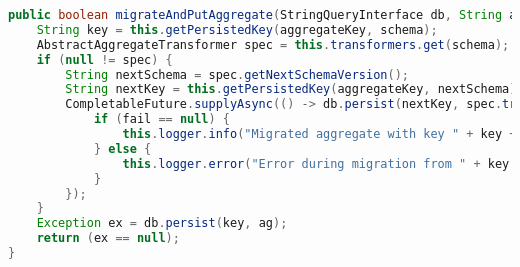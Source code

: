 \begin{lstlisting}[language=Java, caption={Metode for håndtering av PUT-spørring i Migrator.}]
public boolean migrateAndPutAggregate(StringQueryInterface db, String aggregateKey, String schema, String ag) {
    String key = this.getPersistedKey(aggregateKey, schema);
    AbstractAggregateTransformer spec = this.transformers.get(schema);
    if (null != spec) {
        String nextSchema = spec.getNextSchemaVersion();
        String nextKey = this.getPersistedKey(aggregateKey, nextSchema);
        CompletableFuture.supplyAsync(() -> db.persist(nextKey, spec.transformAggregate(ag))).thenAccept((fail) -> {
            if (fail == null) {
                this.logger.info("Migrated aggregate with key " + key + " to " + nextKey);
            } else {
                this.logger.error("Error during migration from " + key + " to " + nextKey + ":\n"+ fail.toString());
            }
        });
    }
    Exception ex = db.persist(key, ag);
    return (ex == null);
}
\end{lstlisting}
